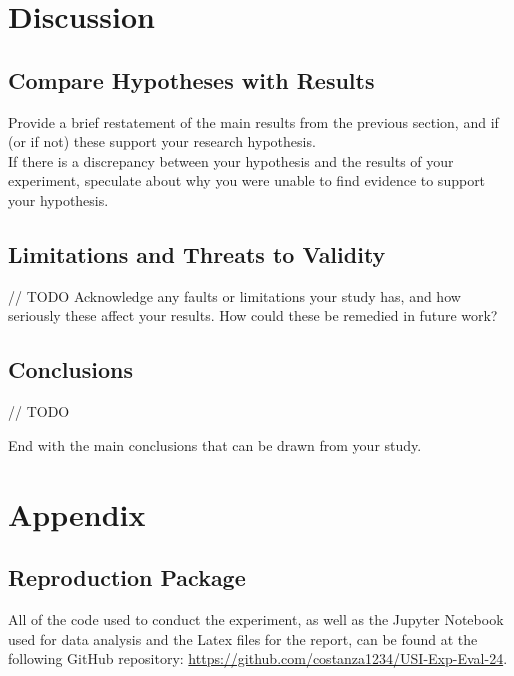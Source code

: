 \documentclass[unicode,11pt,a4paper,oneside,numbers=endperiod,openany]{scrartcl}
\begin{document}
\section{Discussion}

    \subsection{Compare Hypotheses with Results}
    
    Provide a brief restatement of the main results from the previous section, and if (or if not) these support your research hypothesis.\\

    If there is a discrepancy between your hypothesis and the results of your experiment, speculate about why you were unable to find evidence to support your hypothesis. 


    \subsection{Limitations and Threats to Validity}

    // TODO
    Acknowledge any faults or limitations your study has, and how seriously these affect your results. How could these be remedied in future work?


    \subsection{Conclusions}

    // TODO
    
    End with the main conclusions that can be drawn from your study.

\section{Appendix}

    \subsection{Reproduction Package}
    All of the code used to conduct the experiment, as well as the Jupyter Notebook used for data analysis and the Latex files for the report, can be found at the following GitHub repository: \url{https://github.com/costanza1234/USI-Exp-Eval-24}.
\end{document}
